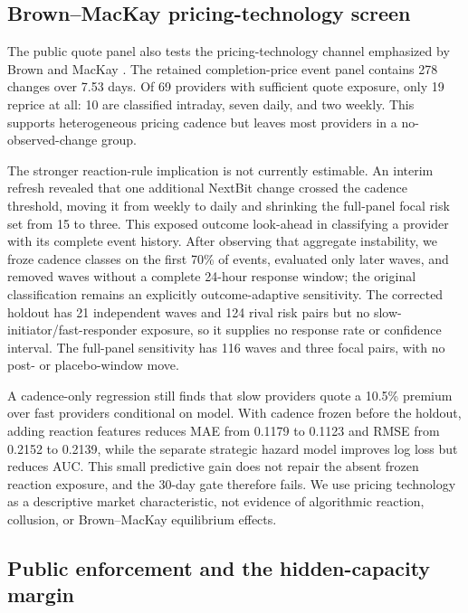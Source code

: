 \documentclass[11pt]{article}
\theoremstyle{definition}
\begin{document}
\subsection{Brown--MacKay pricing-technology screen}

The public quote panel also tests the pricing-technology channel emphasized by
Brown and MacKay \cite{brownmackay2023}. The retained completion-price event
panel contains 278 changes over 7.53 days. Of 69 providers with sufficient
quote exposure, only 19 reprice at all: 10 are classified intraday, seven
daily, and two weekly.
This supports heterogeneous pricing cadence but leaves most providers in a
no-observed-change group.

The stronger reaction-rule implication is not currently estimable. An interim
refresh revealed that one additional NextBit change crossed the cadence
threshold, moving it from weekly to daily and shrinking the full-panel focal
risk set from 15 to three. This exposed outcome look-ahead in classifying a
provider with its complete event history. After observing that aggregate
instability, we froze cadence classes on the first 70\% of events, evaluated
only later waves, and removed waves without a complete 24-hour response window;
the original classification remains an explicitly outcome-adaptive sensitivity.
The corrected holdout has 21 independent waves and 124 rival risk pairs but no
slow-initiator/fast-responder exposure, so it supplies no response rate or
confidence interval. The full-panel sensitivity has 116 waves and three focal
pairs, with no post- or placebo-window move.

A cadence-only regression still finds that slow providers quote a 10.5\%
premium over fast providers conditional on model. With cadence frozen before
the holdout, adding reaction features reduces MAE from 0.1179 to 0.1123 and
RMSE from 0.2152 to 0.2139, while the separate strategic hazard model improves
log loss but reduces AUC. This small predictive gain does not repair the absent
frozen reaction exposure, and the 30-day gate therefore fails.
We use pricing technology as a descriptive market characteristic, not evidence
of algorithmic reaction, collusion, or Brown--MacKay equilibrium effects.

\subsection{Public enforcement and the hidden-capacity margin}
\end{document}

